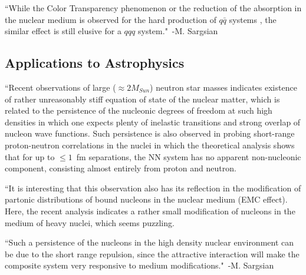 ``While the Color Transparency phenomenon or the reduction of the absorption in the nuclear medium is observed for the hard production of $q\bar{q}$ systems \cite{Frankfurt:1993it,ElFassi:2012nr,Clasie:2007aa}, the similar effect is still elusive for a $qqq$ system."~-M. Sargsian~\cite{Sargsian:2014bwa}

\subsection{Applications to Astrophysics}
``Recent observations of large ($\approx 2M_{Sun}$) neutron star masses \cite{Demorest:2010bx} indicates existence of rather unreasonably stiff equation of state of the nuclear matter, which is related to the persistence of the nucleonic degrees of freedom \cite{Heiselberg:2000dn} at such high densities in which one expects plenty of inelastic transitions and strong overlap of nucleon wave functions. Such persistence is also observed in probing short-range proton-neutron correlations in the nuclei \cite{Subedi:2008zz,Piasetzky:2006ai} in which the theoretical analysis \cite{Frankfurt:2008zv} shows that for up to $\leq 1$~fm separations, the NN system has no apparent non-nucleonic component, consisting almost entirely from proton and neutron.

``It is interesting that this observation also has its reflection in the modification of partonic distributions of bound nucleons in the nuclear medium (EMC effect). Here, the recent analysis \cite{Frankfurt:2012qs} indicates a rather small modification of nucleons in the medium of heavy nuclei, which seems puzzling.

``Such a persistence of the nucleons in the high density nuclear environment can be due to the short range repulsion, since the attractive interaction will make the composite system very responsive to medium modifications."~-M. Sargsian~\cite{Sargsian:2014bwa}